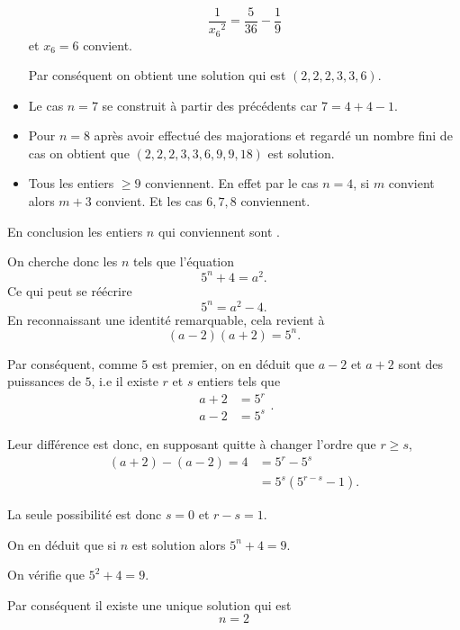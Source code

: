 \begin{sol}
\begin{itemize}
          $$\frac{1}{{x_6}^2} = \frac{5}{36} - \frac{1}{9}$$
          et $x_6 = 6$ convient.


          Par conséquent on obtient une solution qui est $(2,2,2,3,3,6)$.
    \item Le cas $n=7$ se construit à partir des précédents car $7 = 4 + 4 -1$.
    \item Pour $n=8$ après avoir effectué des majorations et regardé un nombre fini de cas on obtient que $(2,2,2,3,3,6,9,9,18)$ est solution.
    \item Tous les entiers $\geq 9$ conviennent. En effet par le cas $n=4$, si $m$ convient alors $m+3$ convient. Et les cas $6,7,8$ conviennent.
  \end{itemize}

  En conclusion les entiers $n$ qui conviennent sont .

\end{sol}
\begin{sol}
  On cherche donc les $n$ tels que l'équation
  $$5^n + 4 = a^2.$$
  Ce qui peut se réécrire
  $$5^n = a^2 - 4.$$
  En reconnaissant une identité remarquable, cela revient à
  $$(a-2)(a+2) = 5^n.$$

  Par conséquent, comme $5$ est premier, on en déduit que $a-2$ et $a+2$ sont des puissances de $5$, i.e il existe $r$ et $s$ entiers tels que
  $$\begin{aligned}
      a + 2 & = 5^r \\
      a - 2 & = 5^s
    \end{aligned}.$$

  Leur différence est donc, en supposant quitte à changer l'ordre que $r \geq s$,
  $$\begin{aligned}
      (a+2)-(a-2) = 4 & = 5^r-5^s          \\
                      & = 5^s (5^{r-s}-1).
    \end{aligned}$$

  La seule possibilité est donc $s=0$ et $r-s=1$.

  On en déduit que si $n$ est solution alors $5^n + 4 = 9$.

  On vérifie que $5^2 + 4 = 9$.

  Par conséquent il existe une unique solution qui est
  $$\boxed{n=2}$$


\end{sol}

